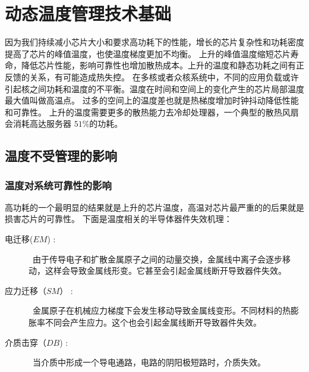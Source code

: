 
\chapter{动态温度管理技术基础}




因为我们持续减小芯片大小和要求高功耗下的性能，增长的芯片复杂性和功耗密度提高了芯片的峰值温度，也使温度梯度更加不均衡。
上升的峰值温度缩短芯片寿命，降低芯片性能，影响可靠性也增加散热成本\cite{skadron:TACO'04}。上升的温度和静态功耗之间有正反馈的关系，有可能造成热失控。
在多核或者众核系统中，不同的应用负载或许引起核之间功耗和温度的不平衡。温度在时间和空间上的变化产生的芯片局部温度最大值叫做高温点\cite{Donald:ISCA'06}。
过多的空间上的温度差也就是热梯度增加时钟抖动降低性能和可靠性。
上升的温度需要更多的散热能力去冷却处理器，一个典型的散热风扇会消耗高达服务器 $51\%$的功耗\cite{lefurgy2003energy}\cite{ayoub2010gentlecool}。


\section{温度不受管理的影响}\label{sec:adverse}

\subsection{温度对系统可靠性的影响}\label{sec:reliability}
高功耗的一个最明显的结果就是上升的芯片温度，高温对芯片最严重的的后果就是损害芯片的可靠性。
下面是温度相关的半导体器件失效机理\cite{jedec2003failure}：
\begin{description}
\item[电迁移($EM$) :] ~由于传导电子和扩散金属原子之间的动量交换，金属线中离子会逐步移动，这样会导致金属线形变。它甚至会引起金属线断开导致器件失效。
\item[应力迁移（$SM$） :] ~金属原子在机械应力梯度下会发生移动导致金属线变形。不同材料的热膨胀率不同会产生应力。这个也会引起金属线断开导致器件失效。
\item[介质击穿（$DB$) :] ~当介质中形成一个导电通路，电路的阴阳极短路时，介质失效。
\end{description}

